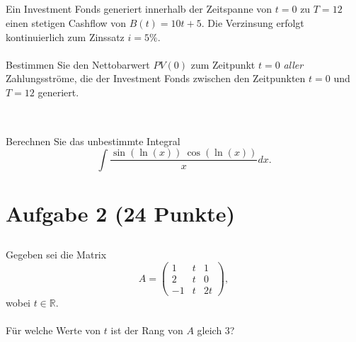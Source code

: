 \subsection*{}
Ein Investment Fonds generiert innerhalb der Zeitspanne von $t=0$ zu $T=12$ einen
stetigen Cashflow von $B(t) = 10 t + 5$.
Die Verzinsung erfolgt kontinuierlich zum Zinssatz $i = 5 \%$.
\\
\\
Bestimmen Sie den Nettobarwert $PV(0)$ zum Zeitpunkt $t = 0$ \textit{aller} Zahlungsströme,
die der Investment Fonds zwischen den Zeitpunkten $t = 0$ und $T = 12$ generiert.
\\
\\
\subsection*{}
Berechnen Sie das unbestimmte Integral
\begin{equation*}
\int \frac{\sin(\ln(x)) \ \cos(\ln(x))}{x} dx.
\end{equation*}

\newpage
\section*{Aufgabe 2 (24 Punkte)}
\vspace{0.4cm}
\subsection*{}
Gegeben sei die Matrix
\begin{equation*}
A = 
\begin{pmatrix}
1 & t & 1 \\
2 & t & 0 \\
-1 & t & 2t
\end{pmatrix},
\end{equation*}
wobei $t \in \mathbb{R}$.
\\
\\
Für welche Werte von $t$ ist der Rang von $A$ gleich $3$?
\\
\\
